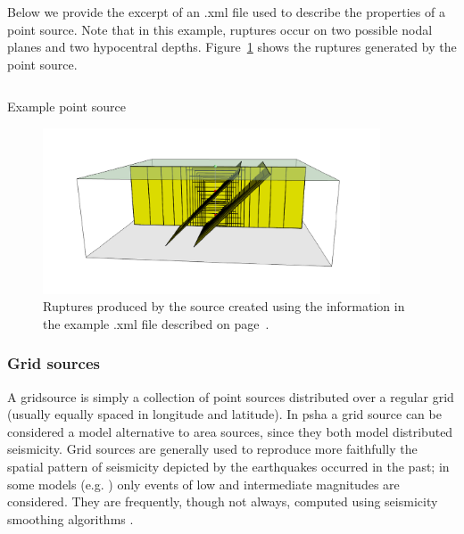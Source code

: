 Below we provide the excerpt of an .xml file used to describe the properties of a point source. Note that in this example, ruptures occur on two possible nodal planes and two hypocentral depths. Figure~\ref{fig:point_source_ruptures} shows the ruptures generated by the point source.

\begin{listing}[htbp]
  \inputminted[firstline=1,firstnumber=1,fontsize=\footnotesize,frame=single,linenos,bgcolor=lightgray]{xml}{oqum/hazard/verbatim/input_point_source.xml}
  \caption{Example point source}
  \label{page:point_source_nrml}
\end{listing}





\begin{figure}[!ht]
\centering
\includegraphics[width=10cm]{figures/hazard/pointsrc_2strike_2hypodep.pdf}
\caption{Ruptures produced by the source created using the information 
in the example .xml file described on page~\pageref{page:point_source_nrml}.}
\label{fig:point_source_ruptures}
\end{figure}

\subsubsection{Grid sources}
\label{subsubsec:grid_sources}

A \gls{gridsource} is simply a collection of point sources distributed over a regular grid (usually equally spaced in longitude and latitude). In \gls{psha} a grid source can be considered a model alternative to area
sources, since they both model distributed seismicity. Grid sources are generally used to reproduce more faithfully the spatial pattern of seismicity depicted by the earthquakes occurred in the past; in
some models (e.g. \citet{petersen2008}) only events of low and intermediate magnitudes are considered. They are frequently, though not always, computed using seismicity smoothing algorithms \citep[][amongst many others]{frankel1995,woo1996}.

